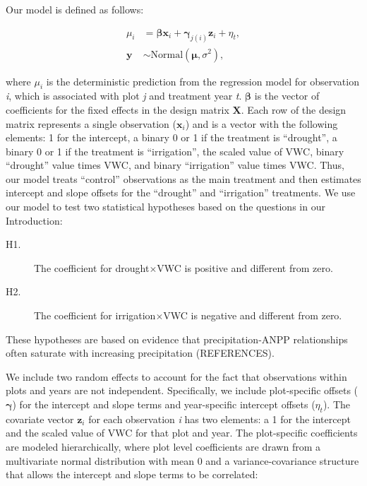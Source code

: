 \documentclass[fleqn,10pt,lineno]{wlpeerj} %
\begin{document}
Our model is defined as follows:

\vspace{-2em}

\begin{align}
\mu_{i} &= \boldsymbol{\beta}\textbf{x}_i + \boldsymbol{\gamma}_{j(i)}\textbf{z}_i + \eta_t, \\
\textbf{y} &\sim \text{Normal} \left(\boldsymbol{\mu}, \sigma^2 \right),
\end{align}

\noindent{}where \(\mu_{i}\) is the deterministic prediction from the
regression model for observation \emph{i}, which is associated with plot
\emph{j} and treatment year \emph{t}. \(\boldsymbol{\beta}\) is the
vector of coefficients for the fixed effects in the design matrix
\(\textbf{X}\). Each row of the design matrix represents a single
observation (\(\textbf{x}_i\)) and is a vector with the following
elements: 1 for the intercept, a binary 0 or 1 if the treatment is
``drought'', a binary 0 or 1 if the treatment is ``irrigation'', the
scaled value of VWC, binary ``drought'' value times VWC, and binary
``irrigation'' value times VWC. Thus, our model treats ``control''
observations as the main treatment and then estimates intercept and
slope offsets for the ``drought'' and ``irrigation'' treatments. We use
our model to test two statistical hypotheses based on the questions in
our Introduction:

\begin{description}
\item [H1.] The coefficient for drought$\times$VWC is positive and different from zero.
\item [H2.] The coefficient for irrigation$\times$VWC is negative and different from zero.
\end{description}

These hypotheses are based on evidence that precipitation-ANPP
relationships often saturate with increasing precipitation (REFERENCES).

We include two random effects to account for the fact that observations
within plots and years are not independent. Specifically, we include
plot-specific offsets (\(\boldsymbol{\gamma}\)) for the intercept and
slope terms and year-specific intercept offsets (\(\eta_t\)). The
covariate vector \(\textbf{z}_i\) for each observation \emph{i} has two
elements: a 1 for the intercept and the scaled value of VWC for that
plot and year. The plot-specific coefficients are modeled
hierarchically, where plot level coefficients are drawn from a
multivariate normal distribution with mean 0 and a variance-covariance
structure that allows the intercept and slope terms to be correlated:
\end{document}
